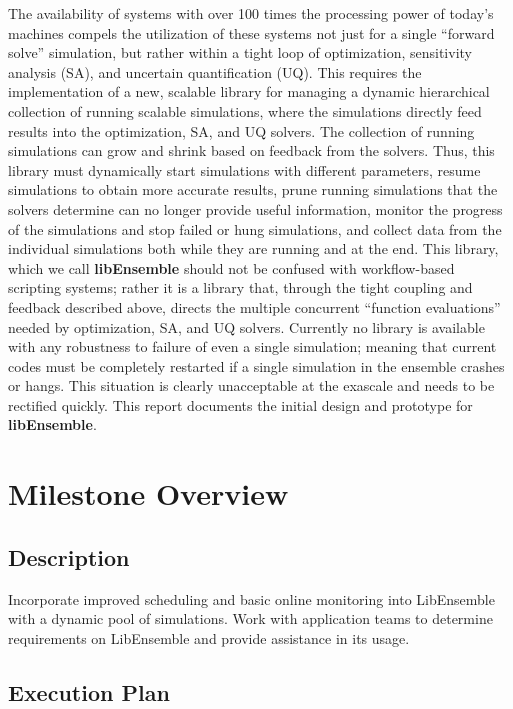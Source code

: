 \documentclass{ecpreport}
\begin{document}
The availability of systems with over 100 times the processing power of today’s 
machines compels the utilization of these systems not just for a single ``forward 
solve'' simulation, but rather within a tight loop of optimization, sensitivity 
analysis (SA), and uncertain quantification (UQ). This requires the implementation 
of a new, scalable library for managing a dynamic hierarchical collection of 
running scalable simulations, where the simulations directly feed results 
into the optimization, SA, and UQ solvers.  The collection of running simulations 
can grow and shrink based on feedback from the solvers. Thus, this library must 
dynamically start simulations with different parameters, resume simulations to 
obtain more accurate results, prune running simulations that the solvers determine 
can no longer provide useful information, monitor the progress of the simulations 
and stop failed or hung simulations, and collect data from the individual 
simulations both while they are running and at the end.  This library, which 
we call {\bf libEnsemble} should not be confused with workflow-based scripting 
systems; rather it is a library that, through the tight coupling and feedback 
described above, directs the multiple concurrent ``function evaluations'' 
needed by optimization, SA, and UQ solvers. Currently no library is available 
with any robustness to failure of even a single simulation; meaning that current
codes must be completely restarted if a single simulation in the ensemble 
crashes or hangs. This situation is clearly unacceptable at the exascale
and needs to be rectified quickly.  This report documents the initial
design and prototype for {\bf libEnsemble}.

\section{Milestone Overview}

\subsection{Description}

 Incorporate improved scheduling and basic online monitoring into LibEnsemble 
with a dynamic pool of simulations. Work with application teams to determine 
requirements on LibEnsemble and provide assistance in its usage.

\subsection{Execution Plan}
\end{document}
